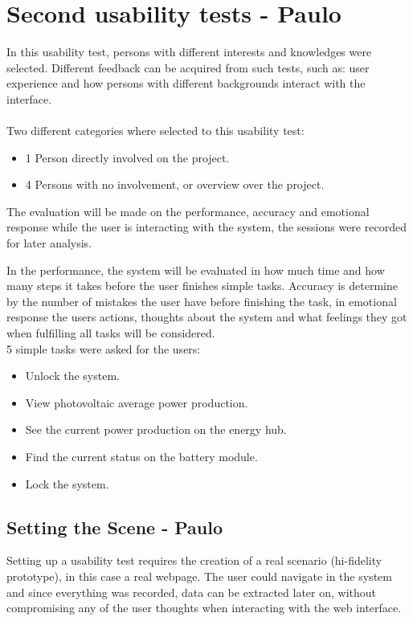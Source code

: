 \section{Second usability tests - Paulo}

In this usability test, persons with different interests and knowledges were selected. Different feedback can be acquired from such tests, such as: user experience and how persons with different backgrounds interact with the interface.
\\
\\Two different categories where selected to this usability test:
\begin{itemize}
	\item 1 Person directly involved on the project.
	\item 4 Persons with no involvement, or overview over the project.
\end{itemize}
The evaluation will be made on the performance, accuracy and emotional response while the user is interacting with the system, the sessions were recorded for later analysis.

In the performance, the system will be evaluated in how much time and how many steps it takes before the user finishes simple tasks. Accuracy is determine by the number of mistakes the user have before finishing the task, in emotional response the users actions, thoughts about the system and what feelings they got when fulfilling all tasks will be considered.
\\ 5 simple tasks were asked for the users:
\begin{itemize}
	\item Unlock the system.
	\item View photovoltaic average power production.
	\item See the current power production on the energy hub.
	\item Find the current status on the battery module.
	\item Lock the system.
\end{itemize}

\subsection{Setting the Scene - Paulo}
Setting up a usability test requires the creation of a real scenario (hi-fidelity prototype), in this case a real webpage. The user could navigate in the system and since everything was recorded, data can be extracted later on, without compromising any of the user thoughts when interacting with the web interface.

